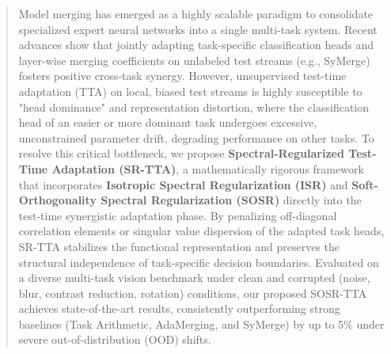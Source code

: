 \documentclass{article}
\theoremstyle{plain}
\theoremstyle{definition}
\theoremstyle{remark}
\begin{document}

\printAffiliationsAndNotice{}  %

\makeatletter
\gdef\@icmltitlerunning{Spectral-Regularized Test-Time Adaptation}
\makeatother

\begin{abstract}
  Model merging has emerged as a highly scalable paradigm to consolidate specialized expert neural networks into a single multi-task system. Recent advances show that jointly adapting task-specific classification heads and layer-wise merging coefficients on unlabeled test streams (e.g., SyMerge) fosters positive cross-task synergy. However, unsupervised test-time adaptation (TTA) on local, biased test streams is highly susceptible to "head dominance" and representation distortion, where the classification head of an easier or more dominant task undergoes excessive, unconstrained parameter drift, degrading performance on other tasks. To resolve this critical bottleneck, we propose \textbf{Spectral-Regularized Test-Time Adaptation (SR-TTA)}, a mathematically rigorous framework that incorporates \textbf{Isotropic Spectral Regularization (ISR)} and \textbf{Soft-Orthogonality Spectral Regularization (SOSR)} directly into the test-time synergistic adaptation phase. By penalizing off-diagonal correlation elements or singular value dispersion of the adapted task heads, SR-TTA stabilizes the functional representation and preserves the structural independence of task-specific decision boundaries. Evaluated on a diverse multi-task vision benchmark under clean and corrupted (noise, blur, contrast reduction, rotation) conditions, our proposed SOSR-TTA achieves state-of-the-art results, consistently outperforming strong baselines (Task Arithmetic, AdaMerging, and SyMerge) by up to 5\% under severe out-of-distribution (OOD) shifts.
\end{abstract}
\end{document}
